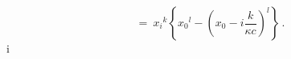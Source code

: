 \begin{equation}[ {x_i}^k , {x_0}^l ] \ = \ {x_i}^k
\left\{ {x_0}^l - \left( x_0 - i\frac{k}{\kappa
c}\right)^l\right\}\, .\label{r213}\end{equation}i
